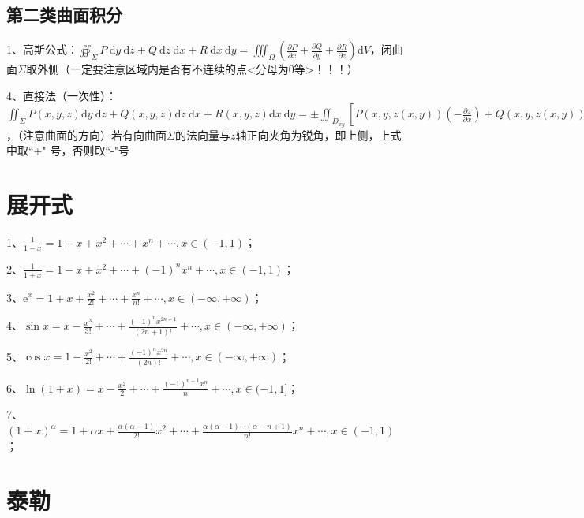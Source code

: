 \subsection{第二类曲面积分}

1、高斯公式：$ \oiint_{\Sigma} P \mathrm{~d} y \mathrm{~d} z+Q \mathrm{~d} z \mathrm{~d} x+R \mathrm{~d} x \mathrm{~d} y=\iiint_{\Omega}\left(\frac{\partial P}{\partial x}+\frac{\partial Q}{\partial y}+\frac{\partial R}{\partial z}\right) \mathrm{d} V $，闭曲面$ \Sigma $取外侧（一定要注意区域内是否有不连续的点<分母为0等>！！！）

4、直接法（一次性）：$ \iint_{\Sigma} P(x, y, z) \mathrm{d} y \mathrm{~d} z+Q(x, y, z) \mathrm{d} z \mathrm{~d} x+R(x, y, z) \mathrm{d} x \mathrm{~d} y = \pm \iint_{D_{x y}}[P(x, y, z(x, y))\left(-\frac{\partial z}{\partial x}\right)+Q(x, y, z(x, y))\left(-\frac{\partial z}{\partial y}\right)+R(x, y, z(x, y))] \mathrm{d} x \mathrm{~d} y $，（注意曲面的方向）若有向曲面$ \Sigma $的法向量与$ z $轴正向夹角为锐角，即上侧，上式中取“+" 号，否则取“-"号

\section{展开式}

1、$ \frac{1}{1-x}=1+x+x^{2}+\cdots+x^{n}+\cdots, x \in(-1,1) $；

2、$ \frac{1}{1+x}=1-x+x^{2}+\cdots+(-1)^{n} x^{n}+\cdots, x \in(-1,1) $；

3、$ \mathrm{e}^{x}=1+x+\frac{x^{2}}{2 !}+\cdots+\frac{x^{n}}{n !}+\cdots, x \in(-\infty,+\infty) $；

4、$ \sin x=x-\frac{x^{3}}{3 !}+\cdots+\frac{(-1)^{n} x^{2 n+1}}{(2 n+1) !}+\cdots, x \in(-\infty,+\infty) $；

5、$ \cos x=1-\frac{x^{2}}{2 !}+\cdots+\frac{(-1)^{n} x^{2 n}}{(2 n) !}+\cdots, x \in(-\infty,+\infty) $；

6、$ \ln (1+x)=x-\frac{x^{2}}{2}+\cdots+\frac{(-1)^{n-1} x^{n}}{n}+\cdots, x \in(-1,1] $；

7、$ (1+x)^{\alpha}=1+\alpha x+\frac{\alpha(\alpha-1)}{2 !} x^{2}+\cdots+\frac{\alpha(\alpha-1) \cdots(\alpha-n+1)}{n !} x^{n}+\cdots, x \in(-1,1) $；

\section{泰勒}



